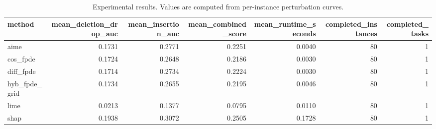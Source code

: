 \begin{table}[t]
\caption{Experimental results. Values are computed from per-instance perturbation curves.}
\label{tab:main_results_computed}
\centering
\begin{tabular}{lrrrrrr}
\toprule
method & mean\_deletion\_drop\_auc & mean\_insertion\_auc & mean\_combined\_score & mean\_runtime\_seconds & completed\_instances & completed\_tasks \\
\midrule
aime & 0.1731 & 0.2771 & 0.2251 & 0.0040 & 80 & 1 \\
cos\_fpde & 0.1724 & 0.2648 & 0.2186 & 0.0030 & 80 & 1 \\
diff\_fpde & 0.1714 & 0.2734 & 0.2224 & 0.0030 & 80 & 1 \\
hyb\_fpde\_grid & 0.1734 & 0.2655 & 0.2195 & 0.0046 & 80 & 1 \\
lime & 0.0213 & 0.1377 & 0.0795 & 0.0110 & 80 & 1 \\
shap & 0.1938 & 0.3072 & 0.2505 & 0.1728 & 80 & 1 \\
\bottomrule
\end{tabular}

\end{table}
